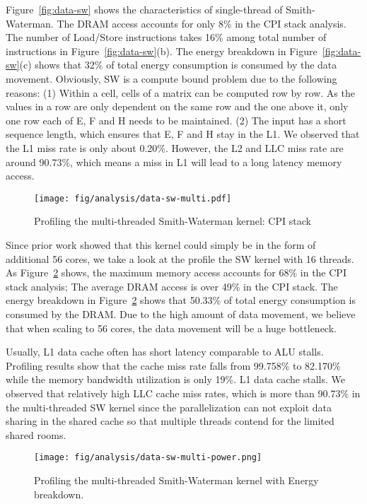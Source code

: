 Figure~\ref{fig:data-sw} shows the characteristics of single-thread of Smith-Waterman. The DRAM access accounts for only 8\% in the CPI stack analysis. The number of Load/Store instructions takes 16\% among total number of instructions in Figure~\ref{fig:data-sw}(b). The energy breakdown in Figure~\ref{fig:data-sw}(c) shows that 32\% of total energy consumption is consumed by the data movement. Obviously, SW is a compute bound problem due to the following reasons: (1) Within a cell, cells of a matrix can be computed row by row. As the values in a row are only dependent on the same row and the one above it, only one row each of E, F and H needs to be maintained. (2) The input has a short sequence length, which ensures that E, F and H stay in the L1. We observed that the L1 miss rate is only about 0.20\%. However, the L2 and LLC miss rate are around 90.73\%, which means a miss in L1 will lead to a long latency memory access.

\begin{figure}[b]
\centering
\texttt{[image: fig/analysis/data-sw-multi.pdf]}
\caption{Profiling the multi-threaded Smith-Waterman kernel: CPI stack}
\label{fig:data-sw-multi}
\end{figure}

Since prior work showed that this kernel could simply be in the form of additional 56 cores, we take a look at the profile the SW kernel with 16 threads. As Figure~\ref{fig:data-sw-multi-energy} shows, the maximum memory access accounts for 68\% in the CPI stack analysis; The average DRAM access is over 49\% in the CPI stack. The energy breakdown in Figure~\ref{fig:data-sw-multi-energy} shows that 50.33\% of total energy consumption is consumed by the DRAM. Due to the high amount of data movement, we believe that when scaling to 56 cores, the data movement will be a huge bottleneck.

Usually, L1 data cache often has short latency comparable to ALU stalls. Profiling results show that the cache miss rate falls from 99.758\% to 82.170\% while the memory bandwidth utilization is only 19\%. L1 data cache stalls. We observed that relatively high LLC cache miss rates, which is more than 90.73\% in the multi-threaded SW kernel since the parallelization can not exploit data sharing in the shared cache so that multiple threads contend for the limited shared rooms.

\begin{figure}[htbp]
\centering
\texttt{[image: fig/analysis/data-sw-multi-power.png]}
\caption{Profiling the multi-threaded Smith-Waterman kernel with Energy breakdown.}
\label{fig:data-sw-multi-energy}
\end{figure}

